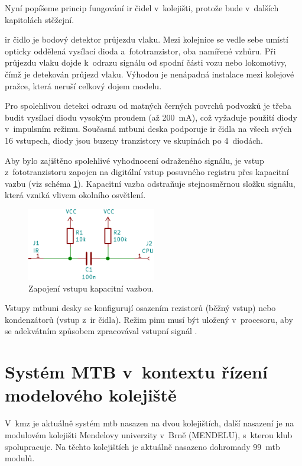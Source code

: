 Nyní popíšeme princip fungování \gls{ir} čidel v~kolejišti, protože bude v~dalších
kapitolách stěžejní.

\gls{ir} čidlo je bodový detektor průjezdu vlaku. Mezi kolejnice se vedle sebe umístí
opticky oddělená vysílací dioda a~fototranzistor, oba namířené vzhůru. Při
průjezdu vlaku dojde k~odrazu signálu od spodní části vozu nebo lokomotivy,
čímž je detekován průjezd vlaku. Výhodou je nenápadná instalace mezi kolejové
pražce, která neruší celkový dojem modelu.

Pro spolehlivou detekci odrazu od matných černých povrchů podvozků je třeba
budit vysílací diodu vysokým proudem (až 200~mA), což vyžaduje použití
diody v~impulsním režimu. Současná \gls{mtbuni} deska podporuje \gls{ir} čidla na
všech svých 16 vstupech, diody jsou buzeny tranzistory ve skupinách po
4~diodách.

Aby bylo zajištěno spolehlivé vyhodnocení odraženého signálu, je vstup
z~fototranzistoru zapojen na digitální vstup posuvného registru přes kapacitní
vazbu (viz schéma \ref{fig:cap-bind}). Kapacitní vazba odstraňuje stejnosměrnou
složku signálu, která vzniká vlivem okolního osvětlení.

\begin{figure}[ht]
\includegraphics[width=0.5\textwidth]{data/cap-bind/capacitive-bind-example.pdf}
\caption{Zapojení vstupu kapacitní vazbou.}
\label{fig:cap-bind}
\end{figure}

Vstupy \gls{mtbuni} desky se konfigurují osazením rezistorů (běžný
vstup) nebo kondenzátorů (vstup z~\gls{ir} čidla). Režim pinu musí být
uložený v~procesoru, aby se adekvátním způsobem zpracovával vstupní signál
\cite{mtbuni22-specs}.


\section{Systém MTB v~kontextu řízení modelového kolejiště} \label{sec:mtb_context}

V~\gls{kmz} je aktuálně systém \gls{mtb} nasazen na dvou kolejištích, další
nasazení je na modulovém kolejišti Mendelovy univerzity v~Brně (MENDELU),
s~kterou klub spolupracuje. Na těchto kolejištích je aktuálně nasazeno
dohromady 99~\gls{mtb} modulů.

